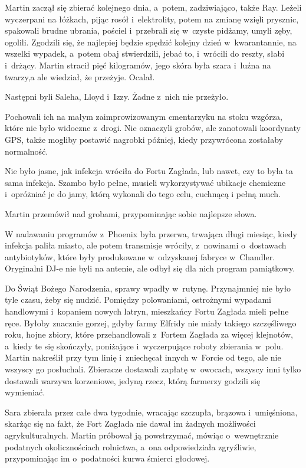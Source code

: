 \documentclass[oneside,polish,11pt,sfheadings]{mwbk}
\begin{document}
Martin zaczął się zbierać kolejnego dnia, a~potem, zadziwiająco, także
Ray. Leżeli wyczerpani na łóżkach, pijąc rosół i~elektrolity, potem na
zmianę wzięli prysznic, spakowali brudne ubrania, pościel i~przebrali
się w~czyste pidżamy, umyli zęby, ogolili. Zgodzili się, że najlepiej
będzie spędzić kolejny dzień w~kwarantannie, na wszelki wypadek, a~potem
obaj stwierdzili, jebać to, i~wrócili do reszty, słabi i~drżący. Martin
stracił pięć kilogramów, jego skóra była szara i~luźna na twarzy,a ale
wiedział, że przeżyje. Ocalał.

Następni byli Saleha, Lloyd i~Izzy. Żadne z~nich nie przeżyło.

Pochowali ich na małym zaimprowizowanym cmentarzyku na stoku wzgórza,
które nie było widoczne z~drogi. Nie oznaczyli grobów, ale zanotowali
koordynaty GPS, także mogliby postawić nagrobki później, kiedy
przywrócona zostałaby normalność.

Nie było jasne, jak infekcja wróciła do Fortu Zagłada, lub nawet, czy to
była ta sama infekcja. Szambo było pełne, musieli wykorzystywać ubikacje
chemiczne i~opróżniać je do jamy, którą wykonali do tego celu, cuchnącą
i pełną much.

Martin przemówił nad grobami, przypominając sobie najlepsze słowa.

W nadawaniu programów z~Phoenix była przerwa, trwająca długi miesiąc,
kiedy infekcja paliła miasto, ale potem transmisje wróciły, z~nowinami o~dostawach antybiotyków, które były produkowane w~odzyskanej fabryce w~Chandler. Oryginalni DJ-e nie byli na antenie, ale odbył się dla nich
program pamiątkowy.

Do Świąt Bożego Narodzenia, sprawy wpadły w~rutynę. Przynajmniej nie
było tyle czasu, żeby się nudzić. Pomiędzy polowaniami, ostrożnymi
wypadami handlowymi i~kopaniem nowych latryn, mieszkańcy Fortu Zagłada
mieli pełne ręce. Byłoby znacznie gorzej, gdyby farmy Elfridy nie miały
takiego szczęśliwego roku, hojne zbiory, które przehandlowali z~Fortem
Zagłada za więcej klejnotów, a~kiedy te się skończyły, poniżające i~wyczerpujące roboty zbierania w~polu. Martin nakreślił przy tym linię i~zniechęcał innych w~Forcie od tego, ale nie wszyscy go posłuchali.
Zbieracze dostawali zapłatę w~owocach, wszyscy inni tylko dostawali
warzywa korzeniowe, jedyną rzecz, którą farmerzy godzili się wymieniać.

Sara zbierała przez całe dwa tygodnie, wracając szczupła, brązowa i~umięśniona, skarżąc się na fakt, że Fort Zagłada nie dawał im żadnych
możliwości agrykulturalnych. Martin próbował ją powstrzymać, mówiąc o~wewnętrznie podatnych okolicznościach rolnictwa, a~ona odpowiedziała
zgryźliwie, przypominając im o~podatności kurwa śmierci głodowej.
\end{document}
